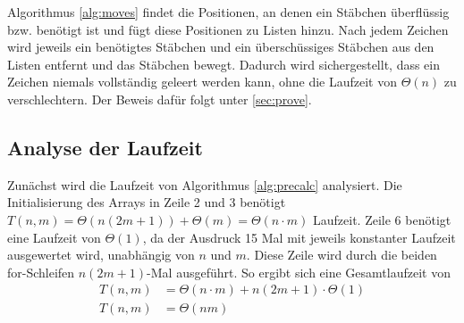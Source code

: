 \documentclass[a4paper,10pt,ngerman]{scrartcl}
\begin{document}
Algorithmus \ref{alg:moves} findet die Positionen, an denen ein Stäbchen überflüssig bzw. benötigt ist und fügt diese Positionen zu Listen hinzu. Nach jedem Zeichen wird jeweils ein benötigtes Stäbchen und ein überschüssiges Stäbchen aus den Listen entfernt und das Stäbchen bewegt. Dadurch wird sichergestellt, dass ein Zeichen niemals vollständig geleert werden kann, ohne die Laufzeit von $\Theta(n)$ zu verschlechtern. Der Beweis dafür folgt unter \ref{sec:prove}.

\subsection{Analyse der Laufzeit}
Zunächst wird die Laufzeit von Algorithmus \ref{alg:precalc} analysiert.
Die Initialisierung des Arrays in Zeile 2 und 3 benötigt $T(n, m) = \Theta(n (2m+1)) + \Theta(m) = \Theta(n \cdot m)$ Laufzeit.
Zeile 6 benötigt eine Laufzeit von $\Theta(1)$, da der Ausdruck 15 Mal mit jeweils konstanter Laufzeit ausgewertet wird, unabhängig von $n$ und $m$.
Diese Zeile wird durch die beiden for-Schleifen $n(2m+1)$-Mal ausgeführt. 
So ergibt sich eine Gesamtlaufzeit von 
\begin{align*}
    T(n, m) &= \Theta(n \cdot m) + n(2m+1) \cdot \Theta(1)\\
    T(n, m) &= \Theta(nm)
\end{align*}
\end{document}
